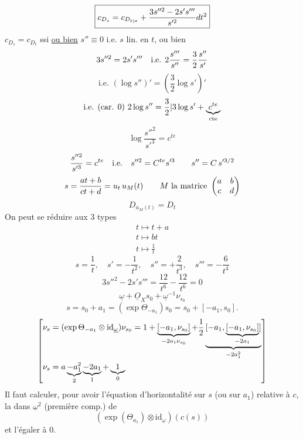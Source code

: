 \[
\boxed{c_{D_s}=c_{D_{{t|\sigma}}}+\frac{3s''^2-2s's'''}{s'^2}dt^2}
\]
 $c_{D_s}=c_{D_t}$ ssi \uline{ou bien} $s''\equiv0$ i.e. $s$ lin. en $t$, ou bien
\[
3s''^2=2s's'''\quad\text{i.e. }{2}\frac{s'''}{s''}=\frac32\frac{s''}{s'}
\]
\[
\text{i.e. }(\log s'')'=\left(\frac32\log s'\right)'
\]
\[
\text{i.e. (car. 0) }2\log s''={\frac32|3}\log s'+\underbrace{c^{te}}_{{{\mathrm{cte}}}}
\]
\[
\log\frac{s''^2}{s'^3}=c^{te}
\]
\[
\frac{s''^2}{s'^3}=c^{te}\quad\text{i.e.}\quad s''^2=C^{{te}}s'^3
\qquad s''=C\,s'^{3/2}
\]
\[
s=\frac{at+b}{ct+d}={{u_t}}\,u_M(t)\qquad
M\text{ la matrice }\begin{pmatrix}a&b\\c&d\end{pmatrix}
\]
\[
D_{u_M(t)}=D_t
\]
On peut se réduire aux 3 types 
\[
\begin{gathered}
t\longmapsto t+a\\
t\longmapsto bt\\
t\longmapsto\frac1t
\end{gathered}
\]
\[
s=\frac1t,\quad s'=-\frac1{t^2},\quad s''=+\frac2{t^3},\quad s'''=-\frac6{t^4}
\]
\[
3s''^2-2s's'''=\frac{12}{t^6}-\frac{12}{t^6}=0
\]
\[
\underline\omega+\underline O_Xs_0+\underline\omega^{-1}\nu_{s_0}
\]
\[
s=s_0+a_1=(\exp\Theta_{-a_1})s_0=s_0+[-a_1,s_0].
\]
\[
\left[\begin{aligned}
\nu_s&=(\exp\Theta_{-a_1}\otimes\mathrm{id}_{\underline\omega})\nu_{s_0}
=1+\underbrace{[-a_1,\nu_{s_0}]}_{-2a_1{\nu_{s_0}}}
+\frac12\underbrace{[-a_1,\underbrace{[-a_1,\nu_{s_0}]}_{-2a_1}]}_{-{2}a_1^2}\\
\nu_s&={{a}}\underbrace{-a_1^2}_{2}\underbrace{-2a_1}_{1}+\underbrace{1}_{0}
\end{aligned}\right]
\]
Il faut calculer, pour avoir l'équation d'horizontalité sur $s$ (ou sur $a_1$) relative à $c$, la  dans $\underline\omega^2$ (première comp.) de
\[
(\exp(\Theta_{a_1})\otimes\mathrm{id}_{\underline\omega})(c(s))
\]
et l'égaler à 0.

